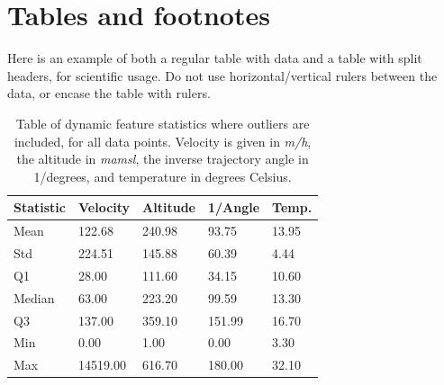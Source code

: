 \section{Tables and footnotes}

Here is an example of both a regular table with data and a table with split headers, for scientific usage. Do not use horizontal/vertical rulers between the data, or encase the table with rulers. \\

\begin{table}[ht!]
\centering
    \begin{tabular}{ m{3cm} m{2.5cm} m{2.5cm} m{2.5cm} m{2cm} } 
    \toprule
    \toprule
    \textbf{Statistic} & \textbf{Velocity} & \textbf{Altitude} & \textbf{1/Angle} & \textbf{Temp.} \\
    \midrule
    Mean    & 122.68    & 240.98   & 93.75     & 13.95 \\[1.3ex]
    Std     & 224.51    & 145.88   & 60.39     & 4.44  \\[1.3ex]
    Q1      & 28.00     & 111.60   & 34.15     & 10.60 \\[1.3ex]
    Median  & 63.00     & 223.20   & 99.59     & 13.30 \\[1.3ex]
    Q3      & 137.00    & 359.10   & 151.99    & 16.70 \\[1.3ex]
    Min     & 0.00      & 1.00     & 0.00      & 3.30  \\[1.3ex]
    Max     & 14519.00  & 616.70   & 180.00    & 32.10 \\[1.3ex]
    \bottomrule
    \bottomrule
    \end{tabular}
\caption[Dynamic feature statistics with outliers]{Table of dynamic feature statistics where outliers are included, for all data points. Velocity is given in \textit{m/h}, the altitude in \textit{mamsl}, the inverse trajectory angle in 1/degrees, and temperature in degrees Celsius.}
\label{table:stat_fliers}
\end{table}


